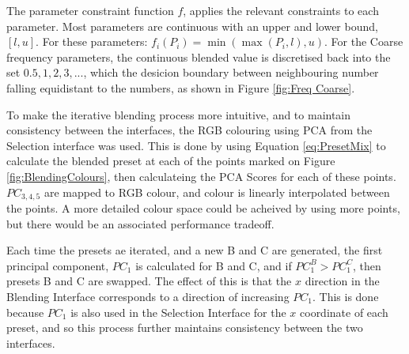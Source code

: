 \documentclass[11pt, oneside]{report}   	%
\begin{document}
The parameter constraint function $f$, applies the relevant constraints to each parameter. Most parameters are continuous with an upper and lower bound, $[l, u]$. For these parameters: $f_i(P_i) = \min(\max(P_i, l), u)$. For the Coarse frequency parameters, the continuous blended value is discretised back into the set ${0.5, 1, 2, 3, ...}$, which the desicion boundary between neighbouring number falling equidistant to the numbers, as shown in Figure \ref{fig:Freq Coarse}.

To make the iterative blending process more intuitive, and to maintain consistency between the interfaces, the RGB colouring using PCA from the Selection interface was used. This is done by using Equation \ref{eq:PresetMix} to calculate the blended preset at each of the points marked on Figure \ref{fig:BlendingColours}, then calculateing the PCA Scores for each of these points. $PC_{3,4,5}$ are mapped to RGB colour, and colour is linearly interpolated between the points. A more detailed colour space could be acheived by using more points, but there would be an associated performance tradeoff. 

Each time the presets ae iterated, and a new B and C are generated, the first principal component, $PC_{1}$ is calculated for B and C, and if $PC_{1}^B > PC_{1}^C $, then presets B and C are swapped. The effect of this is that the $x$ direction in the Blending Interface corresponds to a direction of increasing $PC_{1}$. This is done because $PC_{1}$ is also used in the Selection Interface for the $x$ coordinate of each preset, and so this process further maintains consistency between the two interfaces.
\end{document}
